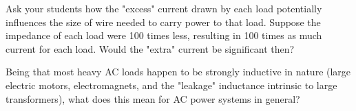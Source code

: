 Ask your students how the "excess" current drawn by each load potentially influences the size of wire needed to carry power to that load.  Suppose the impedance of each load were 100 times less, resulting in 100 times as much current for each load.  Would the "extra" current be significant then?

Being that most heavy AC loads happen to be strongly inductive in nature (large electric motors, electromagnets, and the "leakage" inductance intrinsic to large transformers), what does this mean for AC power systems in general?




